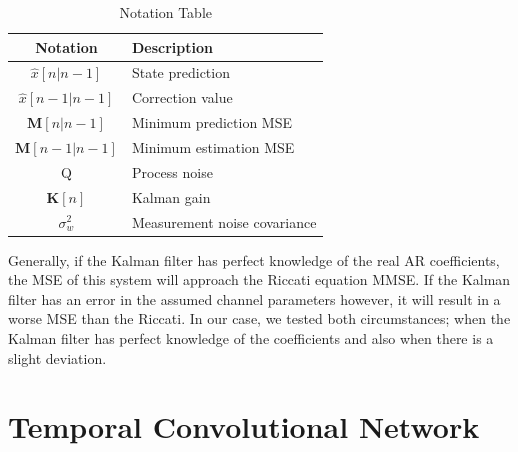 \documentclass[twocolumn,letterpaper]{IEEEAerospaceCLS}  %
\begin{document}
\begin{table}[h!]
\centering
	\begin{tabular}{|c|l|}
	\hline
	Notation           & Description \\ \hline              
	\multirow{2}{*}{$\hat{x}[n|n-1]$} & \multirow{2}{*}{State prediction} \\
	                   & \\ \hline
	\multirow{2}{*}{$\hat{x}[n-1|n-1]$} & \multirow{2}{*}{Correction value} \\
	                   & \\ \hline
	\multirow{2}{*}{$\textbf{M}[n|n-1]$} & \multirow{2}{*}{Minimum prediction MSE} \\
	                   & \\ \hline
	\multirow{2}{*}{$\textbf{M}[n-1|n-1]$} & \multirow{2}{*}{Minimum estimation MSE} \\
	                   & \\ \hline
	\multirow{2}{*}{Q} & \multirow{2}{*}{Process noise} \\
	                   & \\ \hline
	\multirow{2}{*}{$\textbf{K}[n]$} & \multirow{2}{*}{Kalman gain} \\
	                   & \\ \hline
	\multirow{2}{*}{$\sigma_{w}^2$} & \multirow{2}{*}{Measurement noise covariance} \\
	                   & \\ \hline
                   
	\end{tabular}
	\label{tab:NotationTable}
	\caption{Notation Table}
\end{table}

Generally, if the Kalman filter has perfect knowledge of the real AR coefficients, the MSE of this system will approach the Riccati equation MMSE. If the Kalman filter has an error in the assumed channel parameters however, it will result in a worse MSE than the Riccati.  In our case, we tested both circumstances; when the Kalman filter has perfect knowledge of the coefficients and also when there is a slight deviation. 

\section{Temporal Convolutional Network}
\label{sec:TCN}
\end{document}
